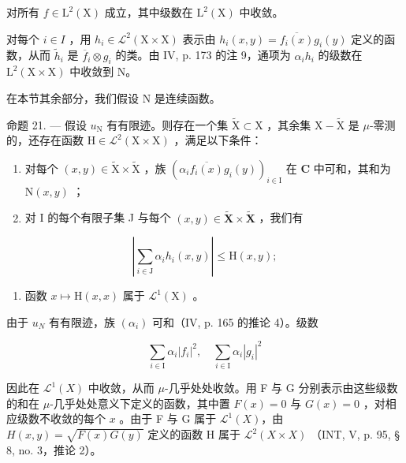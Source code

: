 对所有 \(f \in \mathrm{L}^2(\mathrm{X})\) 成立，其中级数在 \(\mathrm{L}^2(\mathrm{X})\) 中收敛。

对每个 \(i \in I\) ，用 \(h_i \in \mathcal{L}^2(\mathrm{X} \times \mathrm{X})\) 表示由 \(h_i(x, y) = \overline{f_i(x)} g_i(y)\) 定义的函数，从而 \(\widetilde{h}_i\) 是 \(\overline{f}_i \otimes g_i\) 的类。由 IV, p. 173 的注 9，通项为 \(\alpha_i h_i\) 的级数在 \(\mathrm{L}^2(\mathrm{X} \times \mathrm{X})\) 中收敛到 N。

在本节其余部分，我们假设 N 是连续函数。

命题 21. --- 假设 \(u_{\mathrm{N}}\) 有有限迹。则存在一个集 \(\widetilde{\mathrm{X}} \subset \mathrm{X}\) ，其余集 \(\mathrm{X} - \widetilde{\mathrm{X}}\) 是 \(\mu\)-零测的，还存在函数 \(\mathrm{H} \in \mathcal{L}^2(\mathrm{X} \times \mathrm{X})\) ，满足以下条件：

\begin{enumerate}
\def\labelenumi{(\roman{enumi})}
\item
  对每个 \((x,y)\in\widetilde{\mathrm{X}}\times\widetilde{\mathrm{X}}\) ，族 \((\alpha_{i}\overline{f_{i}(x)}g_{i}(y))_{i\in\mathrm{I}}\) 在 \(\mathbf{C}\) 中可和，其和为 \(\mathrm{N}(x,y)\) ；
\item
  对 I 的每个有限子集 J 与每个 \((x,y)\in\widetilde{\mathbf{X}}\times\widetilde{\mathbf{X}}\) ，我们有
\end{enumerate}

\[
\left| \sum_ {i \in \mathrm{J}} \alpha_ {i} h _ {i} (x, y) \right| \leqslant \mathrm{H} (x, y);\tag{14}
\]

\begin{enumerate}
\def\labelenumi{(\roman{enumi})}
\setcounter{enumi}{2}
\tightlist
\item
  函数 \(x \mapsto \mathrm{H}(x, x)\) 属于 \(\mathcal{L}^1(\mathrm{X})\) 。
\end{enumerate}

由于 \(u_{N}\) 有有限迹，族 \((\alpha_{i})\) 可和（IV, p. 165 的推论 4）。级数

\[
\sum_ {i \in \mathrm{I}} \alpha_ {i} | f _ {i} | ^ {2}, \quad \sum_ {i \in \mathrm{I}} \alpha_ {i} | g _ {i} | ^ {2}
\]

因此在 \(\mathcal{L}^{1}(X)\) 中收敛，从而 \(\mu\)-几乎处处收敛。用 F 与 G 分别表示由这些级数的和在 \(\mu\)-几乎处处意义下定义的函数，其中置 \(F(x) = 0\) 与 \(G(x) = 0\) ，对相应级数不收敛的每个 \(x\) 。由于 F 与 G 属于 \(\mathcal{L}^{1}(X)\)，由 \(H(x,y) = \sqrt{F(x)G(y)}\) 定义的函数 H 属于 \(\mathcal{L}^{2}(X \times X)\) （INT, V, p. 95, § 8, no. 3，推论 2）。

